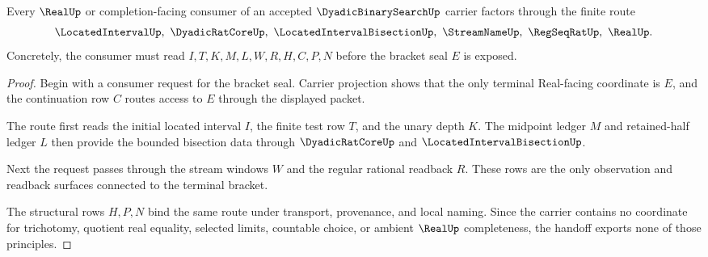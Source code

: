 \begin{theorem}
\label{thm:dyadic-binary-search-real-bracket-handoff}
Every $\RealUp$ or completion-facing consumer of an accepted $\DyadicBinarySearchUp$ carrier factors through the finite route
$$
\LocatedIntervalUp,\ \DyadicRatCoreUp,\ \LocatedIntervalBisectionUp,\ \StreamNameUp,\ \RegSeqRatUp,\ \RealUp .
$$
Concretely, the consumer must read $I,T,K,M,L,W,R,H,C,P,N$ before the bracket seal $E$ is exposed.
\end{theorem}
\begin{proof}
Begin with a consumer request for the bracket seal. Carrier projection shows that the only terminal Real-facing coordinate is $E$, and the continuation row $C$ routes access to $E$ through the displayed packet.

The route first reads the initial located interval $I$, the finite test row $T$, and the unary depth $K$. The midpoint ledger $M$ and retained-half ledger $L$ then provide the bounded bisection data through $\DyadicRatCoreUp$ and $\LocatedIntervalBisectionUp$.

Next the request passes through the stream windows $W$ and the regular rational readback $R$. These rows are the only observation and readback surfaces connected to the terminal bracket.

The structural rows $H,P,N$ bind the same route under transport, provenance, and local naming. Since the carrier contains no coordinate for trichotomy, quotient real equality, selected limits, countable choice, or ambient $\RealUp$ completeness, the handoff exports none of those principles.
\end{proof}


